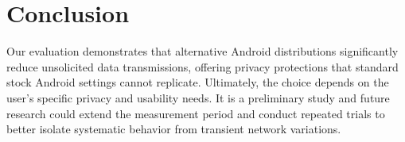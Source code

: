 \section{Conclusion}

Our evaluation demonstrates that alternative Android distributions significantly reduce unsolicited data transmissions, offering privacy protections that standard stock Android settings cannot replicate. Ultimately, the choice depends on the user's specific privacy and usability needs. It is a preliminary study and future research could extend the measurement period and conduct repeated trials to better isolate systematic behavior from transient network variations.